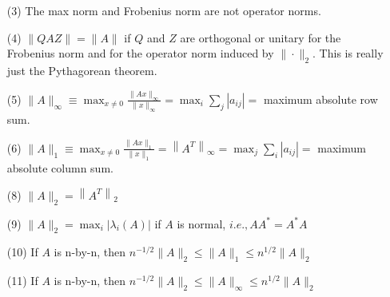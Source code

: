 \documentclass[12pt,letterpaper,reqno]{amsart}
\begin{document}
\begin{enumerate}
\begin{enumerate}
\begin{flushleft}
    \end{flushleft}
    \item[(3)] The max norm and Frobenius norm are not operator norms.
    \begin{flushleft}

    \end{flushleft}
    \item[(4)] $\|QAZ\| = \|A\|$ if $Q$ and $Z$ are orthogonal or unitary for the Frobenius norm and for the operator norm induced by $\|\cdot \|_2$. This is really just the Pythagorean theorem.
    \begin{flushleft}

    \end{flushleft}
    \item[(5)] $ \|A\|_{\infty} \equiv \max _{x \neq 0} \frac{\|A x\|_{\infty}}{\|x\|_{\infty}}=\max _{i} \sum_{j}\left|a_{i j}\right| = $ maximum absolute row sum.
    \begin{flushleft}

    \end{flushleft}
    \item[(6)] $ \|A\|_{1} \equiv \max _{x \neq 0} \frac{\|A x\|_{1}}{\|x\|_{1}}=\left\|A^{T}\right\|_{\infty}=\max _{j} \sum_{i}\left|a_{i j}\right|= $ maximum absolute column sum.
    \begin{flushleft}

    \end{flushleft}
    \item[(8)] $ \|A\|_{2}=\left\|A^{T}\right\|_{2} $
    \begin{flushleft}

    \end{flushleft}
    \item[(9)] $ \|A\|_{2}=\max _{i}\left|\lambda_{i}(A)\right|  $ if $  A  $ is normal, $  i . e ., A A^{*}=A^{*} A $
    \begin{flushleft}

    \end{flushleft}
    \item[(10)] If $  A  $ is n-by-n, then $  n^{-1 / 2}\|A\|_{2} \leq\|A\|_{1} \leq n^{1 / 2}\|A\|_{2} $
    \begin{flushleft}

    \end{flushleft}
    \item[(11)] If $  A  $ is n-by-n, then $  n^{-1 / 2}\|A\|_{2} \leq\|A\|_{\infty} \leq n^{1 / 2}\|A\|_{2} $
    \begin{flushleft}


\end{flushleft}
\end{enumerate}
\end{enumerate}
\end{document}
